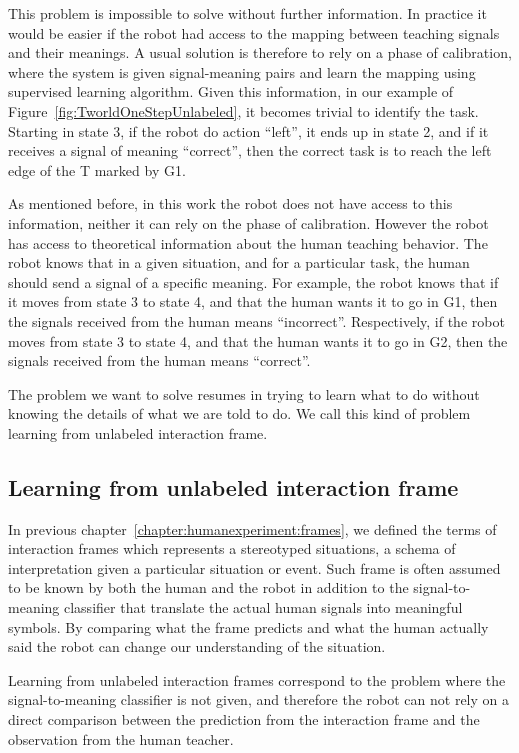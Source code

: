 \transition

This problem is impossible to solve without further information. In practice it would be easier if the robot had access to the mapping between teaching signals and their meanings. A usual solution is therefore to rely on a phase of calibration, where the system is given signal-meaning pairs and learn the mapping using supervised learning algorithm. Given this information, in our example of Figure~\ref{fig:TworldOneStepUnlabeled}, it becomes trivial to identify the task. Starting in state 3, if the robot do action ``left'', it ends up in state 2, and if it receives a signal of meaning ``correct'', then the correct task is to reach the left edge of the T marked by G1.

As mentioned before, in this work the robot does not have access to this information, neither it can rely on the phase of calibration. However the robot has access to theoretical information about the human teaching behavior. The robot knows that in a given situation, and for a particular task, the human should send a signal of a specific meaning. For example, the robot knows that if it moves from state 3 to state 4, and that the human wants it to go in G1, then the signals received from the human means ``incorrect''. Respectively, if the robot moves from state 3 to state 4, and that the human wants it to go in G2, then the signals received from the human means ``correct''.

The problem we want to solve resumes in trying to learn what to do without knowing the details of what we are told to do. We call this kind of problem learning from unlabeled interaction frame. 

\subsection{Learning from unlabeled interaction frame}

In previous chapter~\ref{chapter:humanexperiment:frames}, we defined the terms of interaction frames which represents a stereotyped situations, a schema of interpretation given a particular situation or event. Such frame is often assumed to be known by both the human and the robot in addition to the signal-to-meaning classifier that translate the actual human signals into meaningful symbols. By comparing what the frame predicts and what the human actually said the robot can change our understanding of the situation.

Learning from unlabeled interaction frames correspond to the problem where the signal-to-meaning classifier is not given, and therefore the robot can not rely on a direct comparison between the prediction from the interaction frame and the observation from the human teacher. 


